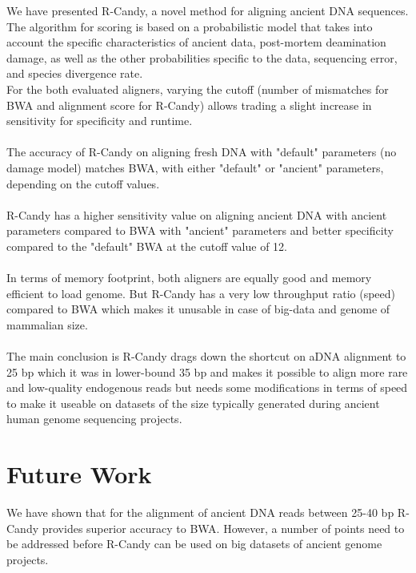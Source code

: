 \documentclass[11pt,a4paper]{report}
\begin{document}
We have presented R-Candy, a novel method for aligning ancient DNA sequences.
The algorithm for scoring is based on a probabilistic model that takes into account 
the specific characteristics of ancient data, post-mortem deamination damage, as 
well as the other probabilities specific to the data, sequencing error, and species
divergence rate. 
\\
For the both evaluated aligners, varying the cutoff (number of mismatches for BWA 
and alignment score for R-Candy) allows trading a slight increase in sensitivity 
for specificity and runtime.
\\\\
The accuracy of R-Candy on aligning fresh DNA with "default" parameters (no damage model) 
matches BWA, with either "default" or "ancient" parameters, depending  on the cutoff values.
\\\\
R-Candy has a higher sensitivity value on aligning ancient DNA with ancient parameters
compared to BWA with "ancient" parameters and better specificity compared to the 
"default" BWA at the cutoff value of 12.
\\\\
In terms of memory footprint, both aligners are equally good and memory efficient
to load genome. But R-Candy has a very low throughput ratio (speed) compared to 
BWA which makes it unusable in case of big-data and genome of mammalian size. 
\\\\
The main conclusion is R-Candy drags down the shortcut on aDNA alignment to 25 bp 
which it was in lower-bound 35 bp and makes it possible to align more rare and 
low-quality endogenous reads but needs some modifications in terms of speed to 
make it useable on datasets of the size typically generated during ancient human
genome sequencing projects. 



 

\section{Future Work} \label{Future Work}
We have shown that for the alignment of ancient DNA reads between 25-40 
bp R-Candy provides superior accuracy to BWA.  
However, a number of points need to be addressed before R-Candy can be used 
on big datasets of ancient genome projects. 

\end{document}
